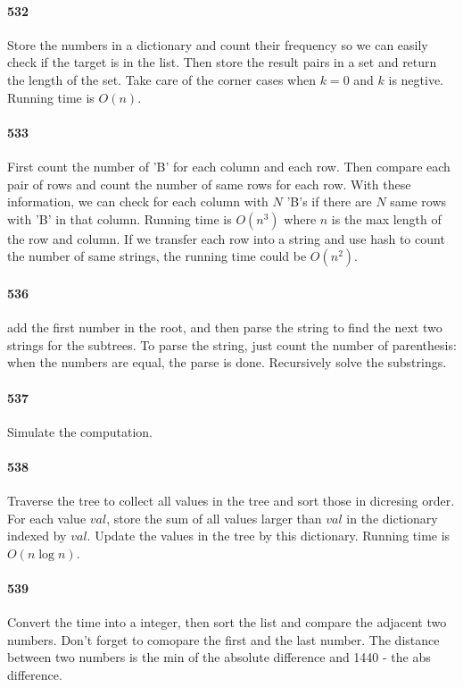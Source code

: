 \documentclass[11pt]{article}
\begin{document}
\paragraph{532}
Store the numbers in a dictionary and count their frequency so we can easily check if the target is in the list. 
Then store the result pairs in a set and return the length of the set. Take care of the corner cases when $k = 0$ 
and $k$ is negtive.
Running time is $O(n)$.


\paragraph{533}
First count the number of 'B' for each column and each row. Then compare each pair of rows and count the number of same rows
for each row. With these information, we can check for each column with $N$ 'B's if there are $N$ same rows with 'B' in that 
column. 
Running time is $O(n^3)$ where $n$ is the max length of the row and column. If we transfer each row into a string and use hash to count the number of same strings, the running time could be $O(n^2)$.

\paragraph{536}
add the first number in the root, and then parse the string to find the next two strings for the subtrees. To parse the 
string, just count the number of parenthesis: when the numbers are equal, the parse is done. Recursively solve the substrings.

\paragraph{537}
Simulate the computation.

\paragraph{538}
Traverse the tree to collect all values in the tree and sort those in dicresing order. For each value $val$, store the sum of 
all values larger than $val$ in the dictionary indexed by $val$. Update the values in the tree by this dictionary.
Running time is $O(n \log n)$.

\paragraph{539}
Convert the time into a integer, then sort the list and compare the adjacent two numbers. Don't forget to comopare the first
and the last number. The distance between two numbers is the min of the absolute difference and 1440 - the abs difference.
\end{document}
